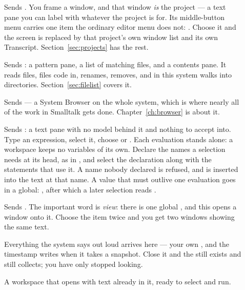 \begin{description}

\item[] Sends . You frame a window, and that
window \emph{is} the project --- a text pane you can label with whatever the
project is for. Its middle-button menu carries one item the ordinary editor
menu does not: . Choose it and the screen is replaced by that
project's own window list and its own Transcript.
Section~\ref{sec:projects} has the rest.

\item[] Sends : a pattern pane, a list of
matching files, and a contents pane. It reads files, files code in, renames,
removes, and in this system walks into directories.
Section~\ref{sec:filelist} covers it.

\item[] Sends  --- a
System Browser on the whole system, which is where nearly all of the work in
Smalltalk gets done. Chapter~\ref{ch:browser} is about it.

\item[] Sends : a text pane with no
model behind it and nothing to accept into. Type an expression, select it,
choose  or . Each evaluation stands alone: a
workspace keeps no variables of its own. Declare the names a selection
needs at its head, as in , and select the
declaration along with the statements that use it. A name nobody declared
is refused, and  is inserted into the text at that
name. A value that must outlive one evaluation goes in a global:
, after which a later selection reads
.

\item[] Sends
. The
important word is \emph{view}: there is one global , and this
opens a window onto it. Choose the item twice and you get two windows showing
the same text.

Everything the system says out loud arrives here --- your own
, and the timestamp  writes when it takes a
snapshot. Close it and the  still exists and still collects;
you have only stopped looking.

\item[] A workspace that opens with text already in it,
ready to select and run.


\end{description}
